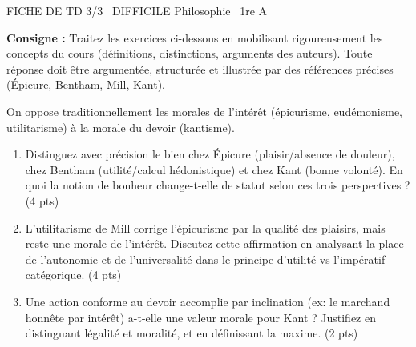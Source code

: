 \documentclass[11pt]{article}
\begin{document}
\begin{tcolorbox}[enhanced,colback=popink,colframe=popink,arc=10pt,boxrule=0pt,left=12pt,right=12pt,top=9pt,bottom=9pt]
{\color{white}\popxbold\small FICHE DE TD 3/3 \textbullet\ DIFFICILE \hfill Philosophie \textbullet\ 1re A\par}
\end{tcolorbox}
\vspace{4pt}
\noindent\textbf{Consigne :} Traitez les exercices ci-dessous en mobilisant rigoureusement les concepts du cours (définitions, distinctions, arguments des auteurs). Toute réponse doit être argumentée, structurée et illustrée par des références précises (Épicure, Bentham, Mill, Kant).

\begin{exercice}
\noindent On oppose traditionnellement les morales de l'intérêt (épicurisme, eudémonisme, utilitarisme) à la morale du devoir (kantisme).
\begin{enumerate}
    \item Distinguez avec précision le \og bien\fg{} chez Épicure (plaisir/absence de douleur), chez Bentham (utilité/calcul hédonistique) et chez Kant (bonne volonté). En quoi la notion de \og bonheur\fg{} change-t-elle de statut selon ces trois perspectives ? (4 pts)
    \item \og L'utilitarisme de Mill corrige l'épicurisme par la qualité des plaisirs, mais reste une morale de l'intérêt.\fg{} Discutez cette affirmation en analysant la place de l'autonomie et de l'universalité dans le principe d'utilité vs l'impératif catégorique. (4 pts)
    \item Une action conforme au devoir accomplie par inclination (ex: le marchand honnête par intérêt) a-t-elle une \og valeur morale\fg{} pour Kant ? Justifiez en distinguant \og légalité\fg{} et \og moralité\fg{}, et en définissant la \og maxime\fg{}. (2 pts)
\end{enumerate}
\end{exercice}
\end{document}
